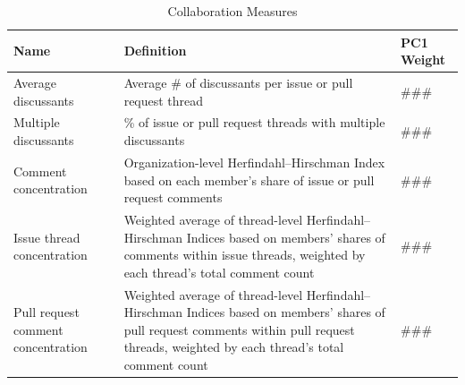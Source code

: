 \begin{longtable}{>{\raggedright\arraybackslash}p{} p{}p{}}
\caption{Collaboration Measures}\label{tab:collaboration_metrics}\\
\toprule
\textbf{Name} & \textbf{Definition} &\textbf{PC1 Weight} \\
\midrule
\endfirsthead

\bottomrule
\endlastfoot


Average discussants & Average \# of discussants per issue or pull request thread & ### \\
Multiple discussants & \% of issue or pull request threads with multiple discussants & ### \\
Comment concentration & Organization-level Herfindahl–Hirschman Index based on each member’s share of issue or pull request comments & ### \\
Issue thread concentration & Weighted average of thread-level Herfindahl–Hirschman Indices based on members’ shares of comments within issue threads, weighted by each thread’s total comment count & ### \\
Pull request comment concentration & Weighted average of thread-level Herfindahl–Hirschman Indices based on members’ shares of pull request comments within pull request threads, weighted by each thread’s total comment count & ###  \\

\end{longtable}



